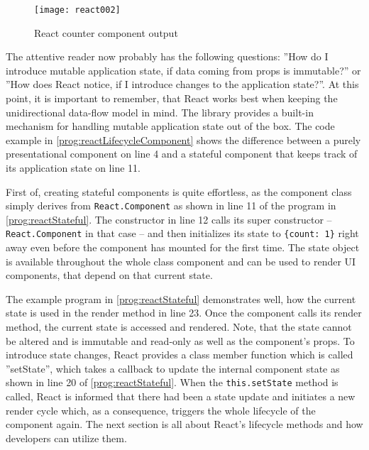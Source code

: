 \begin{figure}
  \centering
  \texttt{[image: react002]}
  \caption{React counter component output}
  \label{fig:reactCounterComponent}
\end{figure}

The attentive reader now probably has the following questions: ''How do I introduce mutable application state, if data coming from props is immutable?'' or ''How does React notice, if I introduce changes to the application state?''. At this point, it is important to remember, that React works best when keeping the unidirectional data-flow model in mind. The library provides a built-in mechanism for handling mutable application state out of the box. The code example in \ref{prog:reactLifecycleComponent} shows the difference between a purely presentational component on line 4 and a stateful component that keeps track of its application state on line 11.

First of, creating stateful components is quite effortless, as the component class simply derives from \texttt{React.Component} as shown in line 11 of the program in \ref{prog:reactStateful}. The constructor in line 12 calls its super constructor -- \texttt{React.Component} in that case -- and then initializes its state to \texttt{\{count: 1\}} right away even before the component has mounted for the first time. The state object is available throughout the whole class component and can be used to render UI components, that depend on that current state.

The example program in \ref{prog:reactStateful} demonstrates well, how the current state is used in the render method in line 23. Once the component calls its render method, the current state is accessed and rendered. Note, that the state cannot be altered and is immutable and read-only as well as the component's props. To introduce state changes, React provides a class member function which is called ''setState'', which takes a callback to update the internal component state as shown in line 20 of \ref{prog:reactStateful}. When the \texttt{this.setState} method is called, React is informed that there had been a state update and initiates a new render cycle which, as a consequence, triggers the whole lifecycle of the component again. The next section is all about React's lifecycle methods and how developers can utilize them.



